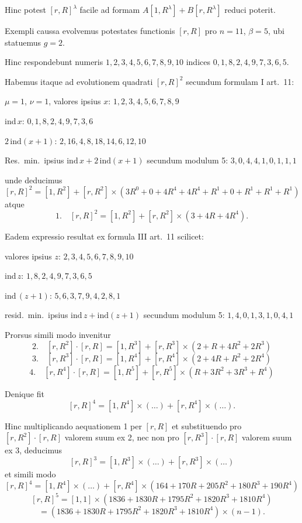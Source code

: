 \documentclass[12pt,a4paper]{article}
\begin{document}
Hinc potest $[r,R]^\lambda$ facile ad formam $A[1, R^\lambda] + B[r, R^\lambda]$ reduci poterit.

Exempli caussa evolvemus potestates functionis $[r,R]$ pro $n=11$, $\beta=5$, ubi statuemus $g=2$.

Hinc respondebunt numeris $1, 2, 3, 4, 5, 6, 7, 8, 9, 10$ indices $0, 1, 8, 2, 4, 9, 7, 3, 6, 5$.

Habemus itaque ad evolutionem quadrati $[r,R]^2$ secundum formulam I art.\ 11:

$\mu=1$, $\nu=1$, valores ipsius $x$: $1, 2, 3, 4, 5, 6, 7, 8, 9$

ind\,$x$: $0, 1, 8, 2, 4, 9, 7, 3, 6$

$2\,\text{ind}(x+1)$: $2, 16, 4, 8, 18, 14, 6, 12, 10$

Res.\ min.\ ipsius $\text{ind}\,x + 2\,\text{ind}(x+1)$ secundum modulum 5: $3, 0, 4, 4, 1, 0, 1, 1, 1$

unde deducimus
\[
[r,R]^2 = [1, R^2] + [r, R^2] \times (3R^0 + 0 + 4R^4 + 4R^4 + R^1 + 0 + R^1 + R^1 + R^1)
\]
atque
\[
1.\quad [r,R]^2 = [1, R^2] + [r, R^2] \times (3 + 4R + 4R^4).
\]

Eadem expressio resultat ex formula III art.\ 11 scilicet:

valores ipsius $z$: $2, 3, 4, 5, 6, 7, 8, 9, 10$

ind\,$z$: $1, 8, 2, 4, 9, 7, 3, 6, 5$

ind\,$(z+1)$: $5, 6, 3, 7, 9, 4, 2, 8, 1$

resid.\ min.\ ipsius $\text{ind}\,z + \text{ind}(z+1)$ secundum modulum 5: $1, 4, 0, 1, 3, 1, 0, 4, 1$

Prorsus simili modo invenitur
\[
2.\quad [r,R^2] \cdot [r,R] = [1, R^3] + [r, R^3] \times (2 + R + 4R^2 + 2R^3)
\]
\[
3.\quad [r,R^3] \cdot [r,R] = [1, R^4] + [r, R^4] \times (2 + 4R + R^2 + 2R^4)
\]
\[
4.\quad [r,R^4] \cdot [r,R] = [1, R^5] + [r, R^5] \times (R + 3R^2 + 3R^3 + R^4)
\]

Denique fit
\[
[r,R]^4 = [1, R^4] \times (\ldots) + [r, R^4] \times (\ldots).
\]

Hinc multiplicando aequationem 1 per $[r,R]$ et substituendo pro $[r,R^2] \cdot [r,R]$ valorem suum ex 2, nec non pro $[r,R^3] \cdot [r,R]$ valorem suum ex 3, deducimus
\[
[r,R]^3 = [1, R^3] \times (\ldots) + [r, R^3] \times (\ldots)
\]
et simili modo
\[
[r,R]^4 = [1, R^4] \times (\ldots) + [r, R^4] \times (164 + 170R + 205R^2 + 180R^3 + 190R^4)
\]
\[
[r,R]^5 = [1, 1] \times (1836 + 1830R + 1795R^2 + 1820R^3 + 1810R^4)
\]
\[
= (1836 + 1830R + 1795R^2 + 1820R^3 + 1810R^4) \times (n-1).
\]
\end{document}
